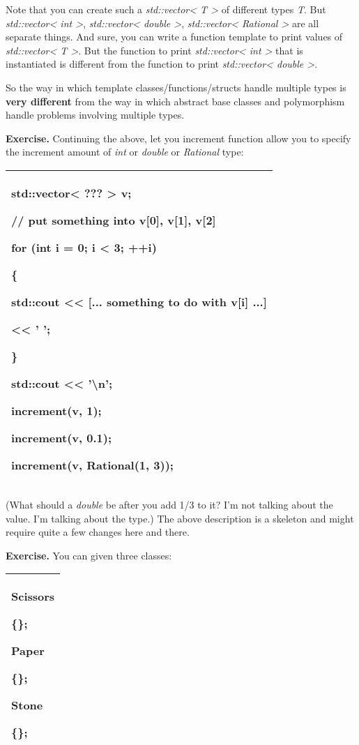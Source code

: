 \documentclass[
]{article}
\begin{document}
Note that you can create such a \emph{std::vector\textless{} T
\textgreater{}} of different types \emph{T}. But
\emph{std::vector\textless{} int \textgreater{}},
\emph{std::vector\textless{} double \textgreater{}},
\emph{std::vector\textless{} Rational \textgreater{}} are all separate
things. And sure, you can write a function template to print values of
\emph{std::vector\textless{} T \textgreater{}}. But the function to
print \emph{std::vector\textless{} int \textgreater{}} that is
instantiated is different from the function to print
\emph{std::vector\textless{} double \textgreater{}}.

So the way in which template classes/functions/structs handle multiple
types is \textbf{very different} from the way in which abstract base
classes and polymorphism handle problems involving multiple types.

\textbf{Exercise.} Continuing the above, let you increment function
allow you to specify the increment amount of \emph{int} or \emph{double}
or \emph{Rational} type:

\begin{longtable}[]{@{}l@{}}
\toprule
\endhead
\begin{minipage}[t]{0.97\columnwidth}\raggedright
std::vector\textless{} ??? \textgreater{} v;

// put something into v{[}0{]}, v{[}1{]}, v{[}2{]}

for (int i = 0; i \textless{} 3; ++i)

\{

std::cout \textless\textless{} {[}... something to do with v{[}i{]}
...{]}

\textless\textless{} ' ';

\}

std::cout \textless\textless{} '\textbackslash n';

increment(v, 1);

increment(v, 0.1);

increment(v, Rational(1, 3));\strut
\end{minipage}\tabularnewline
\bottomrule
\end{longtable}

(What should a \emph{double} be after you add 1/3 to it? I'm not talking
about the value. I'm talking about the type.) The above description is a
skeleton and might require quite a few changes here and there.

\textbf{Exercise. }You can given three classes:

\begin{longtable}[]{@{}l@{}}
\toprule
\endhead
\begin{minipage}[t]{0.97\columnwidth}\raggedright
Scissors

\{\};

Paper

\{\};

Stone

\{\};\strut
\end{minipage}\tabularnewline
\bottomrule
\end{longtable}
\end{document}
